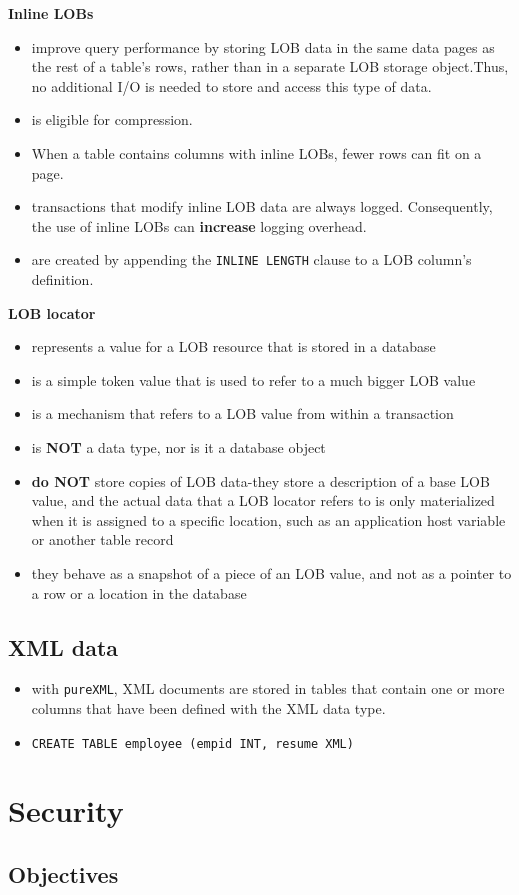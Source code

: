 \documentclass{article}
\begin{document}
\smallskip

\textbf{Inline LOBs}
\begin{itemize}
\item improve query performance by storing LOB data in the same data pages as the rest of 
a table's rows, rather than in a separate LOB storage object.Thus, no additional I/O is needed to store and access this type of data. 
\item is eligible for compression.
\item When a table contains columns with inline LOBs, fewer rows can fit on a page.
\item transactions that modify inline LOB data are always logged. Consequently, the use of inline LOBs
can \textbf{increase} logging overhead.
\item are created by appending the \texttt{INLINE LENGTH} clause to a LOB column's definition.
\end{itemize}

\smallskip

\textbf{LOB locator}
\begin{itemize}
\item represents a value for a LOB resource that is stored in a database
\item is a simple token value that is used to refer to a much bigger LOB value
\item is a mechanism that refers to a LOB value from within a transaction
\item is \textbf{NOT} a data type, nor is it a database object
\item \textbf{do NOT} store copies of LOB data-they store a description of a base LOB value,
and the actual data that a LOB locator refers to is only materialized when it is assigned to a specific
location, such as an application host variable or another table record
\item they behave as a snapshot of a piece of an LOB value, and not as a pointer to a row or a location
in the database
\end{itemize}

\subsection{XML data}
\begin{itemize}
\item with \texttt{pureXML}, XML documents are stored in tables that contain one or more columns that have
been defined with the XML data type.
\item \texttt{CREATE TABLE employee (empid INT, resume XML)}
\end{itemize}

\newpage

\section{Security}
\label{security}

\subsection{Objectives}


%
%
\end{document}
